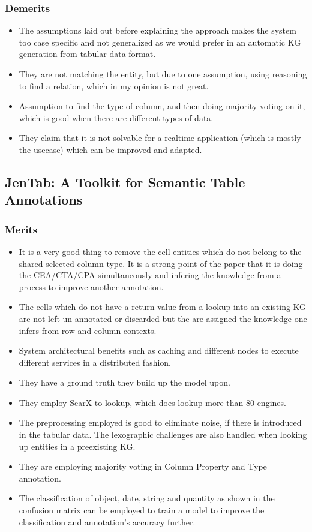 \documentclass[runningheads]{llncs}
\begin{document}
\subsubsection*{Demerits}
\begin{itemize}
    \item The assumptions laid out before explaining the approach makes the system too case specific and not generalized as we would prefer in an automatic KG generation from tabular data format.
    \item They are not matching the entity, but due to one assumption, using reasoning to find a relation, which in my opinion is not great.
    \item Assumption to find the type of column, and then doing majority voting on it, which is good when there are different types of data.
    \item They claim that it is not solvable for a realtime application (which is mostly the usecase) which can be improved and adapted.
\end{itemize}
\subsection{JenTab: A Toolkit for Semantic Table Annotations}
\subsubsection*{Merits}
\begin{itemize}
    \item It is a very good thing to remove the cell entities which do not belong to the shared selected column type. It is a strong point of the paper that it is doing the CEA/CTA/CPA simultaneously and infering the knowledge from a process to improve another annotation. 
    \item The cells which do not have a return value from a lookup into an existing KG are not left un-annotated or discarded but the are assigned the knowledge one infers from row and column contexts.
    \item System architectural benefits such as caching and different nodes to execute different services in a distributed fashion.
    \item They have a ground truth they build up the model upon.
    \item They employ SearX to lookup, which does lookup more than 80 engines. 
    \item The preprocessing employed is good to eliminate noise, if there is introduced in the tabular data. The lexographic challenges are also handled when looking up entities in a preexisting KG. 
    \item They are employing majority voting in Column Property and Type annotation.
    \item The classification of object, date, string and quantity as shown in the confusion matrix can be employed to train a model to improve the classification and annotation's accuracy further.
\end{itemize}
\end{document}
